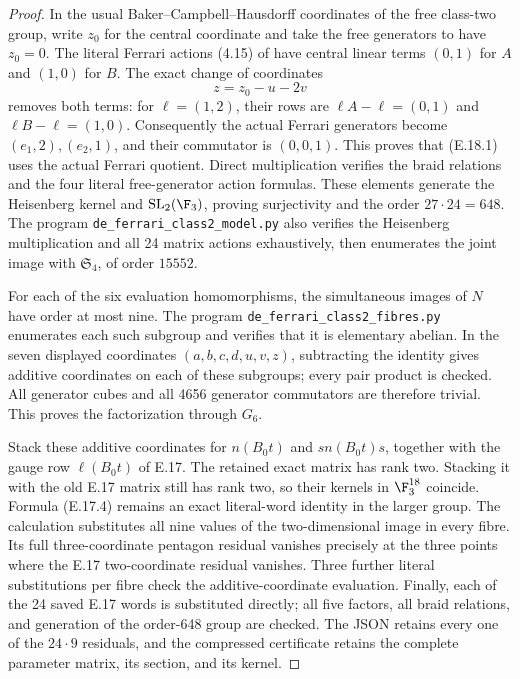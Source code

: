 \begin{proof}
In the usual Baker--Campbell--Hausdorff coordinates of the free
class-two group, write $z_0$ for the central coordinate and
take the free generators to have $z_0=0$. The literal Ferrari
actions (4.15) of \cite{DE_NakamuraTsunogaiYasuda2010} have
central linear terms $(0,1)$ for $A$ and $(1,0)$ for $B$.
The exact change of coordinates
\[
                 z=z_0-u-2v
\]
removes both terms: for $\ell=(1,2)$, their rows are
$\ell A-\ell=(0,1)$ and $\ell B-\ell=(1,0)$.
Consequently the actual Ferrari generators become
$(e_1,2),(e_2,1)$, and their commutator is $(0,0,1)$.
This proves that (E.18.1) uses the actual Ferrari quotient.
Direct multiplication verifies the braid relations and the
four literal free-generator action formulas. These elements
generate the Heisenberg kernel and $\mathrm{SL}_2(\F_3)$,
proving surjectivity and the order $27\cdot24=648$.
The program \texttt{de\_ferrari\_class2\_model.py} also verifies
the Heisenberg multiplication and all 24 matrix actions
exhaustively, then enumerates the joint image with
$\mathfrak S_4$, of order $15552$.

For each of the six evaluation homomorphisms, the simultaneous
images of $N$ have order at most nine. The program
\texttt{de\_ferrari\_class2\_fibres.py} enumerates each such
subgroup and verifies that it is elementary abelian. In the
seven displayed coordinates $(a,b,c,d,u,v,z)$, subtracting
the identity gives additive coordinates on each of these
subgroups; every pair product is checked. All generator
cubes and all 4656 generator commutators are therefore
trivial. This proves the factorization through $G_6$.

Stack these additive coordinates for $n(B_0t)$ and
$s n(B_0t)s$, together with the gauge row $\ell(B_0t)$
of E.17. The retained exact matrix has rank two. Stacking
it with the old E.17 matrix still has rank two, so their
kernels in $\F_3^{18}$ coincide. Formula (E.17.4) remains
an exact literal-word identity in the larger group.
The calculation substitutes all nine values of the
two-dimensional image in every fibre. Its full
three-coordinate pentagon residual vanishes precisely
at the three points where the E.17 two-coordinate
residual vanishes. Three further literal substitutions
per fibre check the additive-coordinate evaluation.
Finally, each of the 24 saved E.17 words is substituted
directly; all five factors, all braid relations, and
generation of the order-648 group are checked. The
JSON retains every one of the $24\cdot9$ residuals,
and the compressed certificate retains the complete
parameter matrix, its section, and its kernel.
\end{proof}

